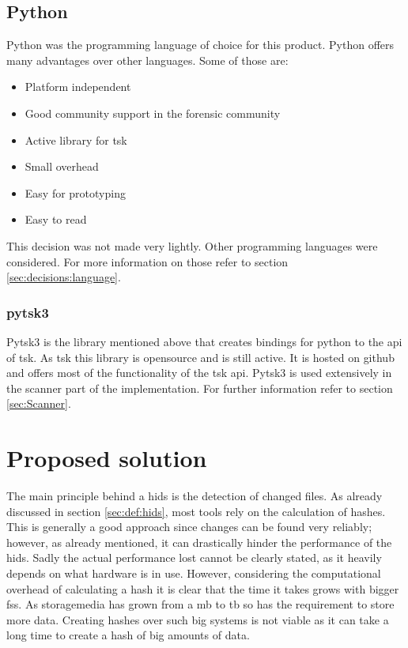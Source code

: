 \subsection{Python}
\label{sec:python}

Python was the programming language of choice for this product. Python offers many advantages over other languages. Some of those are:

\begin{itemize}
    \item Platform independent
    \item Good community support in the forensic community
    \item Active library for \gls{tsk}
    \item Small overhead
    \item Easy for prototyping
    \item Easy to read
\end{itemize}

This decision was not made very lightly. Other programming languages were considered. For more information on those refer to section \ref{sec:decisions:language}.

\subsubsection{pytsk3}
\label{sec:pytsk3}

Pytsk3 is the library mentioned above that creates bindings for python to the \gls{api} of \gls{tsk}. As \gls{tsk} this library is \gls{opensource} and is still active. It is hosted on \gls{github} and offers most of the functionality of the \gls{tsk} \gls{api}. Pytsk3 is used extensively in the scanner part of the implementation. For further information refer to section \ref{sec:Scanner}.

\section{Proposed solution}
\label{sec:hids}

The main principle behind a \gls{hids} is the detection of changed files. As already discussed in section \ref{sec:def:hids}, most tools rely on the calculation of hashes. This is generally a good approach since changes can be found very reliably; however, as already mentioned, it can drastically hinder the performance of the \gls{hids}. Sadly the actual performance lost cannot be clearly stated, as it heavily depends on what hardware is in use. However, considering the computational overhead of calculating a \gls{hash} it is clear that the time it takes grows with bigger \glspl{fs}. As \gls{storagemedia} has grown from a \gls{mb} to \gls{tb} so has the requirement to store more data. Creating hashes over such big systems is not viable as it can take a long time to create a hash of big amounts of data. \cite{hash:slow, hash:veryslow, hash:speed}

